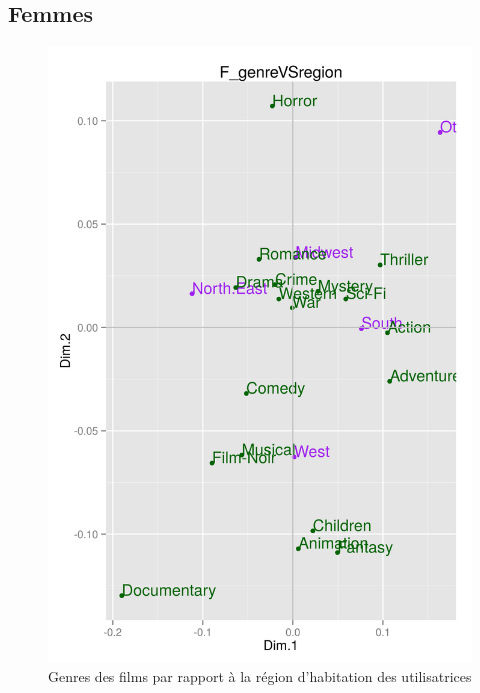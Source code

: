 \documentclass[11pt]{article}
\begin{document}
\subsection{Femmes}
\begin{figure}[htd]
\centering
\includegraphics[scale=0.65]{./images/F_genreVSregion}
\caption{Genres des films par rapport à la région d'habitation des utilisatrices}
\end{figure}

\pagebreak
\end{document}
